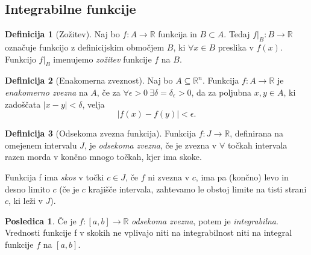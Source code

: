 \documentclass[11pt]{article}
\theoremstyle{definition}
\newtheorem{definicija}{Definicija}[section]
\newtheorem*{posledica}{Posledica}
\begin{document}

\subsection{Integrabilne funkcije}

\begin{definicija}[Zožitev]

Naj bo $f:A \rightarrow \mathbb{R}$ funkcija in $B \subset A$. Tedaj $f |_B: B \rightarrow \mathbb{R}$ označuje funkcijo z definicijskim območjem $B$, ki $\forall x \in B$ preslika v $f(x)$. Funkcijo $f |_B$ imenujemo \textit{zožitev} funkcije $f$ na $B$.   

\end{definicija}
\vspace{0.5cm}

\begin{definicija}[Enakomerna zveznost]

Naj bo $A \subseteq \mathbb{R}^n$. Funkcija $f: A \rightarrow \mathbb{R}$ je \textit{enakomerno zvezna} na $A$, če za $\forall \epsilon > 0 ~ \exists \delta = \delta_\epsilon > 0$, da za poljubna $x, y \in A$, ki zadoščata $|x-y| < \delta$, velja
$$|f(x) - f(y)| < \epsilon.$$ 

\end{definicija}
\vspace{0.5cm}

\begin{definicija}[Odsekoma zvezna funkcija]

Funkcija $f: J \rightarrow \mathbb{R}$, definirana na omejenem intervalu $J$, je \textit{odsekoma zvezna}, če je zvezna v $\forall$ točkah intervala razen morda v končno mnogo točkah, kjer ima skoke.

Funkcija f ima \textit{skos} v točki $c \in J$, če $f$ ni zvezna v $c$, ima pa (končno) levo in desno limito $c$ (če je $c$ krajišče intervala, zahtevamo le obstoj limite na tisti strani $c$, ki leži v $J$). 

\end{definicija}

\begin{posledica}

Če je $f:[a, b] \rightarrow \mathbb{R}$ \textit{odsekoma zvezna}, potem je \textit{integrabilna}. Vrednosti funkcije f v skokih ne vplivajo niti na integrabilnost niti na integral funkcije $f$ na $[a, b]$.

\end{posledica}
\vspace{0.5cm}
\end{document}
